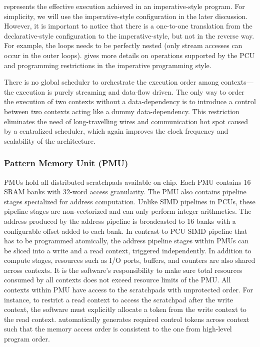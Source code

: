  represents the effective execution achieved in an imperative-style program.
For simplicity, we will use the imperative-style configuration in the later discussion.
However, it is important to notice that there is a one-to-one translation from the 
declarative-style configuration to the imperative-style, but not in the reverse way.
For example, the loops needs to be perfectly nested (only stream accesses can occur in the outer
loops).
 gives more details on operations supported by the PCU and programming
restrictions in the imperative programming style.

There is no global scheduler to orchestrate the execution order among contexts---the execution is purely
streaming and data-flow driven. 
The only way to order the execution of two contexts without a data-dependency is to 
introduce a control  between two contexts acting like a dummy data-dependency.
This restriction eliminates the need of long-travelling wires and communication hot spot caused by a
centralized scheduler, which  again improves the clock frequency and scalability of the architecture.

\subsubsection{Pattern Memory Unit (PMU)}
PMUs hold all distributed scratchpads available on-chip. 
Each PMU contains 16 SRAM banks with
32-word access granularity. The PMU also contains pipeline stages specialized for address
computation. Unlike SIMD pipelines in PCUs, these pipeline stages are non-vectorized and can only 
perform integer arithmetics. 
The address produced by the address pipeline is broadcasted to 16 banks with a configurable offset added to each bank.
In contrast to PCU SIMD pipeline that has to be programmed atomically, the address pipeline stages 
within PMUs can be sliced into a write and a read context, triggered independently.
In addition to compute stages, resources such as I/O ports, buffers, and counters are also shared across contexts.
It is the software's responsibility to make sure total resources consumed by all
contexts does not exceed resource limits of the PMU.
All contexts within PMU have access to the scratchpads with unprotected order. For instance, to
restrict a read context to access the scratchpad after the write context, the software must explicitly allocate
a token from the write context to the read context.
\name automatically generates required control tokens across context such that the memory access order is
consistent to the one from high-level program order.

